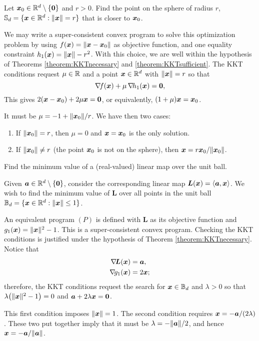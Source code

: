 \begin{example}
Let $\boldsymbol{x}_0 \in \mathbb{R}^d\setminus\{\boldsymbol{0}\}$ and $r>0$.  Find the point on the sphere of radius $r$, $\mathbb{S}_d=\{ \boldsymbol{x} \in \mathbb{R}^d: \lVert \boldsymbol{x} \rVert=r \}$ that is closer to $\boldsymbol{x}_0$. 

 We may write a super-consistent convex program to solve this optimization problem by using $f(\boldsymbol{x})=\lVert \boldsymbol{x}-\boldsymbol{x}_0 \rVert$ as objective function, and one equality constraint $h_1(\boldsymbol{x})=\lVert \boldsymbol{x} \rVert-r^2$.  With this choice, we are well within the hypothesis of Theorems \ref{theorem:KKTnecessary} and \ref{theorem:KKTsufficient}.  The KKT conditions request $\mu \in \mathbb{R}$ and a point $\boldsymbol{x} \in \mathbb{R}^d$ with $\lVert \boldsymbol{x} \rVert = r$ so that
\begin{equation*} 
\mathop{\nabla\! {f}}(\boldsymbol{x}) + \mu\mathop{\nabla\! {h_1}}(\boldsymbol{x}) = \boldsymbol{0},
\end{equation*}
This gives $2(\boldsymbol{x}-\boldsymbol{x}_0)+2\mu\boldsymbol{x} = \boldsymbol{0}$, or equivalently, $(1+\mu)\boldsymbol{x} = \boldsymbol{x}_0$.

It must be $\mu = -1+\lVert \boldsymbol{x}_0 \rVert/r$.  We have then two cases:
\begin{enumerate}
	\item If $\lVert \boldsymbol{x}_0 \rVert=r$, then $\mu=0$ and $\boldsymbol{x}=\boldsymbol{x}_0$ is the only solution.
	\item If $\lVert \boldsymbol{x}_0 \rVert \neq r$ (the point $\boldsymbol{x}_0$ is not on the sphere), then $\boldsymbol{x} = r\boldsymbol{x}_0/\lVert \boldsymbol{x}_0 \rVert$.
\end{enumerate}
\end{example}

\begin{example}
Find the minimum value of a (real-valued) linear map over the unit ball.

Given $\boldsymbol{a} \in \mathbb{R}^d\setminus\{ \boldsymbol{0}\}$, consider the corresponding linear map $\boldsymbol{L}(\boldsymbol{x}) = \langle \boldsymbol{a}, \boldsymbol{x} \rangle$.  We wish to find the minimum value of $\boldsymbol{L}$ over all points in the unit ball $\mathbb{B}_d = \{ \boldsymbol{x} \in \mathbb{R}^d : \lVert \boldsymbol{x} \rVert \leq 1 \}$.

An equivalent program $(P)$ is defined with $\boldsymbol{L}$ as its objective function and $g_1(\boldsymbol{x}) = \lVert \boldsymbol{x} \rVert^2-1$. This is a super-consistent convex program.  Checking the KKT conditions is justified under the hypothesis of Theorem \ref{theorem:KKTnecessary}. Notice that
\begin{align*}
\mathop{\nabla\! {\boldsymbol{L}}}(\boldsymbol{x}) &= \boldsymbol{a}, \\
\mathop{\nabla\! {g_1}}(\boldsymbol{x}) &= 2\boldsymbol{x};
\end{align*}
therefore, the KKT conditions request the search for $\boldsymbol{x} \in \mathbb{B}_d$ and $\lambda > 0$ so that $\lambda \big( \lVert \boldsymbol{x} \rVert^2-1 \big)=0$ and $\boldsymbol{a}+2\lambda\boldsymbol{x}=\boldsymbol{0}$.

This first condition imposes $\lVert \boldsymbol{x} \rVert=1$.  The second condition requires $\boldsymbol{x} = -\boldsymbol{a}/(2\lambda)$.  These two put together imply that it must be $\lambda = -\lVert \boldsymbol{a} \rVert/2$, and hence $\boldsymbol{x} = -\boldsymbol{a}/\lVert \boldsymbol{a} \rVert$.
\end{example}